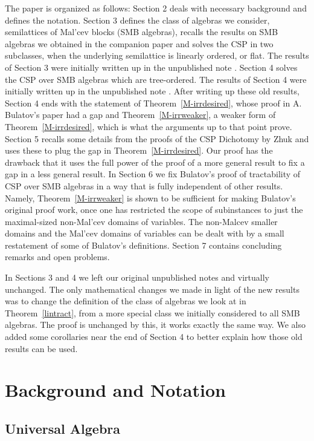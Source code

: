 \documentclass[11pt]{amsart}
\theoremstyle{definition}
\begin{document}
The paper is organized as follows: Section 2 deals with necessary background and defines the notation. Section 3 defines the class of algebras we consider, semilattices of Mal'cev blocks (SMB algebras), recalls the results on SMB algebras we obtained in the companion paper \cite{SMB1} and solves the CSP in two subclasses, when the underlying semilattice is linearly ordered, or flat. The results of Section 3 were initially written up in the unpublished note \cite{RP}. Section 4 solves the CSP over SMB algebras which are tree-ordered. The results of Section 4 were initially written up in the unpublished note \cite{M2}. After writing up these old results, Section 4 ends with the statement of Theorem~\ref{M-irrdesired}, whose proof in A. Bulatov's paper \cite{BuSMB} had a gap and Theorem~\ref{M-irrweaker}, a weaker form of Theorem~\ref{M-irrdesired}, which is what the arguments up to that point prove. Section 5 recalls some details from the proofs of the CSP Dichotomy by Zhuk and uses these to plug the gap in Theorem~\ref{M-irrdesired}. Our proof has the drawback that it uses the full power of the proof of a more general result to fix a gap in a less general result. In Section 6 we fix Bulatov's proof of tractability of CSP over SMB algebras in a way that is fully independent of other results. Namely, Theorem~\ref{M-irrweaker} is shown to be sufficient for making Bulatov's original proof work, once one has restricted the scope of subinstances to just the maximal-sized non-Mal'cev domains of variables. The non-Malcev smaller domains and the Mal'cev domains of variables can be dealt with by a small restatement of some of Bulatov's definitions. Section 7 contains concluding remarks and open problems.

In Sections 3 and 4 we left our original unpublished notes \cite{RP} and \cite{MMontop} virtually unchanged. The only mathematical changes we made in light of the new results was to change the definition of the class of algebras we look at in Theorem~\ref{lintract}, from a more special class we initially considered to all SMB algebras. The proof is unchanged by this, it works exactly the same way. We also added some corollaries near the end of Section 4 to better explain how those old results can be used.

\section{Background and Notation}

\subsection{Universal Algebra}
\end{document}
